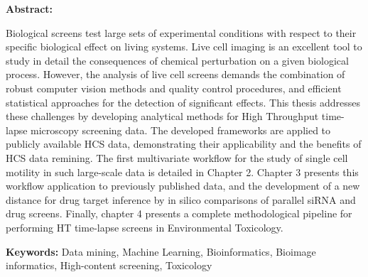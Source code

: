 \documentclass[11pt, oneside]{Thesis} %
\begin{document}
%
%
\noindent
{\large {\bf Abstract:}}~\begin{small} Biological screens test large sets of experimental conditions with respect to their specific biological effect on living systems. %
Live cell imaging is an excellent tool to study in detail the consequences of chemical perturbation on a given biological process. However, the analysis of live cell screens demands the combination of robust computer vision methods and quality control procedures, and efficient statistical approaches for the detection of significant effects. %
This thesis addresses these challenges by developing analytical methods for High Throughput time-lapse microscopy screening data. The developed frameworks are applied to publicly available HCS data, demonstrating their applicability and the benefits of HCS data remining. %
The first multivariate workflow for the study of single cell motility in such large-scale data is detailed in Chapter 2. Chapter 3 presents this workflow application to previously published data, and the development of a new distance for drug target inference by in silico comparisons of parallel siRNA and drug screens. Finally, chapter 4 presents a complete methodological pipeline for performing HT time-lapse screens in Environmental Toxicology.%
 

{\large {\bf Keywords:}} Data mining, Machine Learning, Bioinformatics, Bioimage informatics, High-content screening, Toxicology
\end{small}
\end{document}
